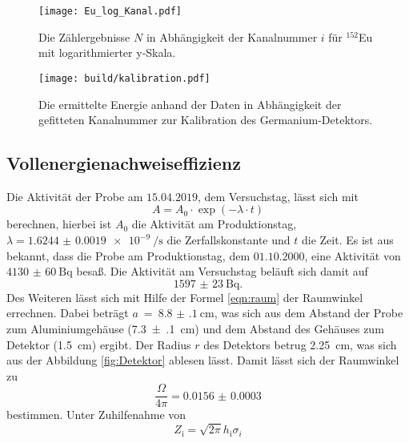 \begin{figure}[htb]
 \centering
 \texttt{[image: Eu\_log\_Kanal.pdf]}
 \caption{Die Zählergebnisse $N$ in Abhängigkeit der Kanalnummer $i$ für ${}^{152}$Eu mit logarithmierter y-Skala.}
 \label{fig:Eu_log_Kanal}
\end{figure}

\begin{figure}[htb]
 \centering
 \texttt{[image: build/kalibration.pdf]}
 \caption{Die ermittelte Energie anhand der Daten in Abhängigkeit der gefitteten Kanalnummer zur Kalibration des Germanium-Detektors.}
 \label{fig:kalibration}
\end{figure}


\FloatBarrier

\subsection{Vollenergienachweiseffizienz}
\label{sec:Vollenergienachweiseffizenz}
Die Aktivität der Probe am $15.04.2019$, dem Versuchstag, lässt sich mit
\begin{equation}
  A = A_0 \cdot \exp{\left(-\lambda \cdot t\right)}
\end{equation}
berechnen, hierbei ist $A_0$ die Aktivität am Produktionstag,
$\lambda = \SI[per-mode = reciprocal-positive-first]{1.6244(19)e-9}{\per\second}$ \cite{referenz1} 
die Zerfallskonstante und $t$ die Zeit. Es ist aus \cite{V18} bekannt, dass die Probe am Produktionstag, dem
$01.10.2000$, eine Aktivität von $\SI{4130(60)}{\becquerel}$ besaß.
Die Aktivität am Versuchstag beläuft sich damit auf
\begin{equation*}
  \SI{1597(23)}{\becquerel}.
\end{equation*}
Des Weiteren lässt sich mit Hilfe der Formel \ref{eqn:raum} der Raumwinkel errechnen.
Dabei beträgt $a~=~\SI{8.8(1)}{\centi\meter}$, was sich aus dem Abstand der Probe zum
Aluminiumgehäuse (\SI{7.3(1)}{\centi\meter}) und dem Abstand des Gehäuses zum Detektor 
(\SI{1.5}{\centi\meter}) ergibt. Der Radius $r$ des Detektors betrug \SI{2.25}{\centi\meter}, was sich
aus der Abbildung \ref{fig:Detektor} ablesen lässt. Damit lässt sich der Raumwinkel zu
\begin{equation*}
  \frac{\Omega}{4\pi} = \num{0.0156(3)}
\end{equation*}
bestimmen.
Unter Zuhilfenahme von
\begin{equation}
  Z_\text{i} = \sqrt{2\pi} h_\text{i} \sigma_{i}
\end{equation}
